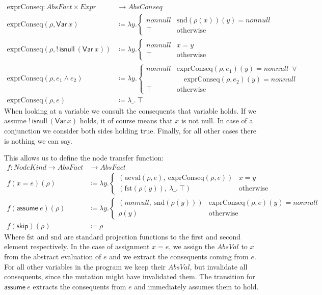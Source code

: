 \documentclass[runningheads]{llncs}
\newcommand{\Expr}{\mathit{Expr}}
\newcommand{\AbsVal}{\mathit{AbsVal}}
\newcommand{\AbsConseq}{\mathit{AbsConseq}}
\newcommand{\AbsFact}{\mathit{AbsFact}}
\newcommand{\NodeKind}{\mathit{NodeKind}}
\newcommand{\nonnull}{\mathit{nonnull}}
\newcommand{\kVar}{\mathsf{Var}}
\newcommand{\kisnull}{\mathsf{isnull}}
\newcommand{\kskip}{\mathsf{skip}}
\newcommand{\kassume}{\mathsf{assume}}
\newcommand{\aeval}{\mathrm{aeval}}
\newcommand{\exprConseq}{\mathrm{exprConseq}}
\newcommand{\fst}{\mathrm{fst}}
\newcommand{\snd}{\mathrm{snd}}
\begin{document}
\begin{align*}
  \exprConseq : \AbsFact \times \Expr & \to \AbsConseq \\
  \exprConseq(\rho, \kVar\ x) & \coloneqq \lambda y.
    \begin{cases} \nonnull & \snd(\rho(x))(y) = \nonnull \\ \top & \text{otherwise} \end{cases} \\
  \exprConseq(\rho, {!}\,\kisnull\ (\kVar\ x)) & \coloneqq \lambda y.
    \begin{cases} \nonnull & x = y \\ \top & \text{otherwise} \end{cases} \\
\exprConseq(\rho, e_1 \wedge e_2) & \coloneqq \lambda y.
    \begin{cases}
      \nonnull & \exprConseq(\rho, e_1)(y) = \nonnull \;\vee \\
               & \quad \exprConseq(\rho, e_2)(y) = \nonnull \\
      \top     & \text{otherwise}
    \end{cases} \\
  \exprConseq(\rho, e) & \coloneqq \lambda \_.\ \top
\end{align*}
When looking at a variable we consult the consequents that variable holds. If we assume ${!}\,\kisnull\ (\kVar\ x)$ holds, it of course means that $x$ is not null. In case of a conjunction we consider both sides holding true. Finally, for all other cases there is nothing we can say.

This allows us to define the node transfer function:
\begin{align*}
  f : \NodeKind \to \AbsFact & \to \AbsFact \\
  f(x = e)(\rho) & \coloneqq \lambda y.
    \begin{cases}
      (\aeval(\rho, e),\ \exprConseq(\rho, e)) & x = y \\
      (\fst(\rho(y)),\ \lambda \_.\ \top) & \text{otherwise}
    \end{cases} \\
  f(\kassume\ e)(\rho) & \coloneqq \lambda y.
    \begin{cases}
      (\nonnull,\ \snd(\rho(y))) & \exprConseq(\rho, e)(y) = \nonnull \\
      \rho(y) & \text{otherwise}
    \end{cases} \\
  f(\kskip)(\rho) & \coloneqq \rho
\end{align*}
Where $\fst$ and $\snd$ are standard projection functions to the first and second element respectively. In the case of assignment $x = e$, we assign the $\AbsVal$ to $x$ from the abstract evaluation of $e$ and we extract the consequents coming from $e$. For all other variables in the program we keep their $\AbsVal$, but invalidate all consequents, since the mutation might have invalidated them. The transition for $\kassume\ e$ extracts the consequents from $e$ and immediately assumes them to hold.
\end{document}
